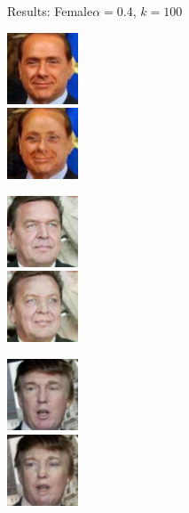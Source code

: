 \documentclass[11pt]{beamer}
\begin{document}
\begin{frame}{Results: Female}{$\alpha=0.4$, $k=100$}
	\centering
	\begin{minipage}{81px}
		\includegraphics[width=80px]{../pictures/outputs/start-imgs/Berlusconi.png}\\
		\includegraphics[width=80px]{../pictures/outputs/female_alpha0.4_k100/Berlusconi.png}
	\end{minipage}%
	\begin{minipage}{81px}
		\includegraphics[width=80px]{../pictures/outputs/start-imgs/Schroeder.png}\\
		\includegraphics[width=80px]{../pictures/outputs/female_alpha0.4_k100/Schroeder.png}
	\end{minipage}%
	\begin{minipage}{81px}
		\includegraphics[width=80px]{../pictures/outputs/start-imgs/Trump.png}\\
		\includegraphics[width=80px]{../pictures/outputs/female_alpha0.4_k100/Trump.png}
	\end{minipage}%

\end{frame}
\end{document}
